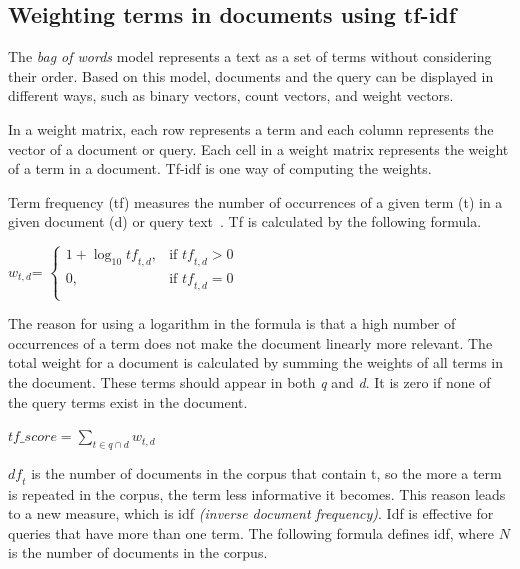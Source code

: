 \documentclass{IOS-Book-Article}
\begin{document}
\subsection{Weighting terms in documents using tf-idf}
\label{sec:tfidf}
The \emph{bag of words} model represents a text as a set of terms without considering their order.
Based on this model, documents and the query can be displayed in different ways, such as binary vectors, count vectors, and weight vectors.


In a weight matrix, each row represents a term and each column represents the vector of a document or query. Each cell in a weight matrix represents the weight of a term in a document. Tf-idf is one way of computing the weights.

Term frequency (tf) measures the number of occurrences of a given term (t) in a given document (d) or query text~\citep{SALTON1988}. 
Tf is calculated by the following formula. 
\begin{center} 
	$w_{t,d}$=
	$\begin{cases}
	1+\log_{10} \mathit{tf}_{t,d}, & \text{if $\mathit{tf}_{t,d}>0$} \\
	0, & \text{if $\mathit{tf}_{t,d}=0$}\\
	\end{cases}$
\end{center}

The reason for using a logarithm in the formula is that a high number of occurrences of a term does not make the document linearly more relevant.
The total weight for a document is calculated by summing the weights of all terms in the document.
These terms should appear in both \textit{q} and \textit{d}.
It is zero if none of the query terms exist in the document.

\begin{center}
	$\mathit{tf\_score}=\sum_{t\in q\cap d} w_{t,d}$
\end{center}

$\mathit{df}_t$ is the number of documents in the corpus that contain t, so the more a term is repeated in the corpus, the term less informative it becomes.
This reason leads to a new measure, which is idf \emph{(inverse document frequency)}.
Idf is effective for queries that have more than one term.
The following formula defines idf, where $N$ is the number of documents in the corpus.
\end{document}
